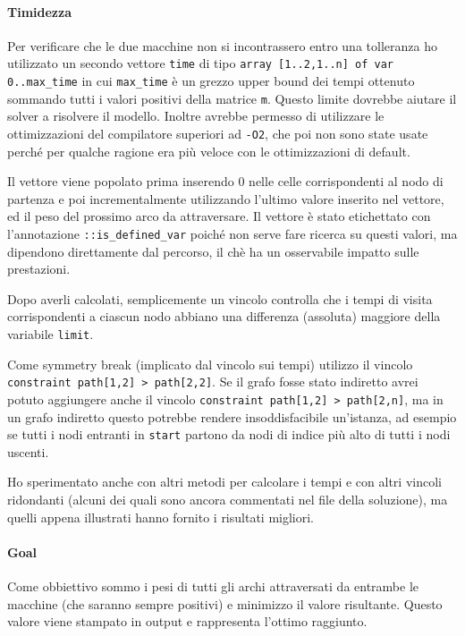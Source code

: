 \documentclass[11pt, a4paper]{article}
\begin{document}
\paragraph{Timidezza}
Per verificare che le due macchine non si incontrassero entro una tolleranza ho utilizzato un secondo vettore \lstinline{time} di tipo \lstinline{array [1..2,1..n] of var 0..max_time} in cui \lstinline{max_time} è un grezzo upper bound dei tempi ottenuto sommando tutti i valori positivi della matrice \lstinline{m}.
Questo limite dovrebbe aiutare il solver a risolvere il modello. Inoltre avrebbe permesso di utilizzare le ottimizzazioni del compilatore superiori ad \lstinline{-O2}, che poi non sono state usate perché per qualche ragione era più veloce con le ottimizzazioni di default.

Il vettore viene popolato prima inserendo $0$ nelle celle corrispondenti al nodo di partenza e poi incrementalmente utilizzando l'ultimo valore inserito nel vettore, ed il peso del prossimo arco da attraversare. Il vettore è stato etichettato con l'annotazione \lstinline{::is_defined_var} poiché non serve fare ricerca su questi valori, ma dipendono direttamente dal percorso, il chè ha un osservabile impatto sulle prestazioni.

Dopo averli calcolati, semplicemente un vincolo controlla che i tempi di visita corrispondenti a ciascun nodo abbiano una differenza (assoluta) maggiore della variabile \lstinline{limit}.

Come symmetry break (implicato dal vincolo sui tempi) utilizzo il vincolo \lstinline{constraint path[1,2] > path[2,2]}.
Se il grafo fosse stato indiretto avrei potuto aggiungere anche il vincolo \lstinline{constraint path[1,2] > path[2,n]}, ma in un grafo indiretto questo potrebbe rendere insoddisfacibile un'istanza, ad esempio se tutti i nodi entranti in \lstinline{start} partono da nodi di indice più alto di tutti i nodi uscenti.

Ho sperimentato anche con altri metodi per calcolare i tempi e con altri vincoli ridondanti (alcuni dei quali sono ancora commentati nel file della soluzione), ma quelli appena illustrati hanno fornito i risultati migliori.

\paragraph{Goal}
Come obbiettivo sommo i pesi di tutti gli archi attraversati da entrambe le macchine (che saranno sempre positivi) e minimizzo il valore risultante.
Questo valore viene stampato in output e rappresenta l'ottimo raggiunto.
\end{document}
